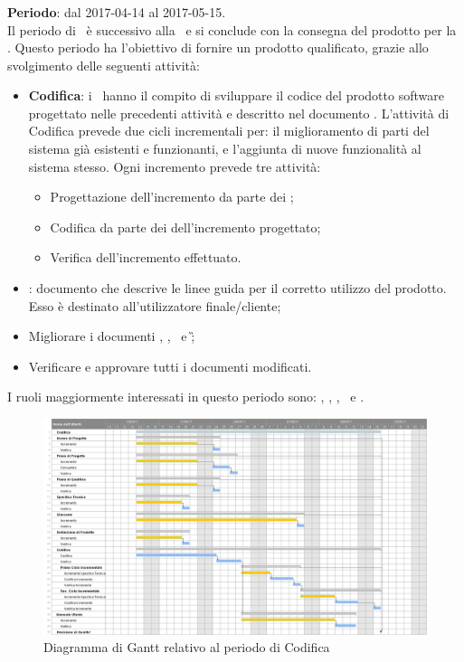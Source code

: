 		\subsubsection{\CO}
		\textbf{Periodo}: dal 2017-04-14 al 2017-05-15.\\
		Il periodo di \CO\ è successivo alla \PD\ e si conclude con la consegna del prodotto per la \RQ. Questo periodo ha l'obiettivo di fornire un prodotto qualificato, grazie allo svolgimento delle seguenti attività:
		\begin{itemize}
			\item \textbf{Codifica}: i \textit{\Progrs}\ hanno il compito di sviluppare il codice del prodotto software progettato nelle precedenti attività e descritto nel documento \DDP. L’attività di Codifica prevede due cicli incrementali per: il miglioramento
			di parti del sistema già esistenti e funzionanti, e l’aggiunta di nuove funzionalità al sistema stesso.
			Ogni incremento prevede tre attività:
			\begin{itemize}
				\item Progettazione dell’incremento da parte dei \textit{\Progs};
				\item Codifica da parte dei \textit{\Progrs} dell’incremento progettato;
				\item Verifica dell’incremento effettuato.
			\end{itemize}
			\item \textit{\MU}: documento che descrive le linee guida per il corretto utilizzo del prodotto. Esso è destinato all’utilizzatore finale/cliente;
			\item  Migliorare i documenti \NdP, \PdP, \PdQ\ e \G;
			\item Verificare e approvare tutti i documenti modificati.
		\end{itemize}
		I ruoli maggiormente interessati in questo periodo sono: \textit{\Amm}, \textit{\Res}, \textit{\Prog}, \textit{\Progr}\ e \textit{\Ver}.
		
		\begin{figure}[H]
			\centering
			\includegraphics[scale=0.40]{img/ganttnetbreak5.png}
			\caption{Diagramma di Gantt relativo al periodo di Codifica}
		\end{figure}
		
